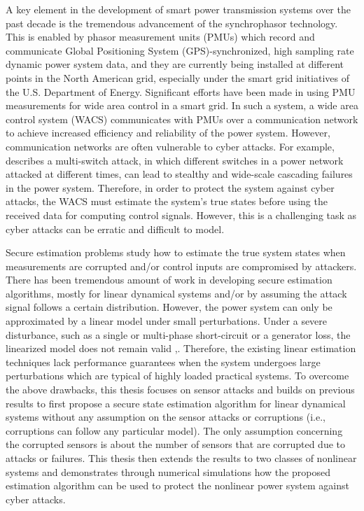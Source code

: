 \documentclass[../thesis.tex]{subfiles}
\begin{document}
A key element in the development of smart power transmission systems over the past decade is the tremendous advancement of the synchrophasor technology. 
This is enabled by phasor measurement units (PMUs) which record and communicate Global Positioning System (GPS)-synchronized, high sampling rate dynamic power system data, and they are currently being installed at different points in the North American grid, especially under the smart grid initiatives of the U.S. Department of Energy.
Significant efforts have been made in using PMU measurements for wide area control in a smart grid. 
In such a system, a wide area control system (WACS) communicates with PMUs over a communication network to achieve increased efficiency and reliability of the power system.
However, communication networks are often vulnerable to cyber attacks. 
For example, \cite{liu2014coordinated} describes a multi-switch attack, in which different switches in a power network attacked at different times, can lead to stealthy and wide-scale cascading failures in the power system.
Therefore, in order to protect the system against cyber attacks, the WACS must estimate the system's true states before using the received data for computing control signals.
However, this is a challenging task as cyber attacks can be erratic and difficult to model. 

Secure estimation problems study how to estimate the true system states when measurements are corrupted and/or control inputs are compromised by attackers.
There has been tremendous amount of work in developing secure estimation algorithms, mostly for linear dynamical systems and/or by assuming the attack signal follows a certain distribution.
However, the power system can only be approximated by a linear model under small perturbations. 
Under a severe disturbance, such as a single or multi-phase short-circuit or a generator loss, the linearized model does not remain valid \cite{Kundur},\cite{nonlin_est}. 
Therefore, the existing linear estimation techniques lack performance guarantees when the system undergoes large perturbations which are typical of highly loaded practical systems. 
To overcome the above drawbacks, this thesis focuses on sensor attacks and builds on previous results to first propose a secure state estimation algorithm for linear dynamical systems without any assumption on the sensor attacks or corruptions (i.e., corruptions can follow any particular model).
The only assumption concerning the corrupted sensors is about the number of sensors that are corrupted due to attacks or failures. 
This thesis then extends the results to two classes of nonlinear systems and demonstrates through numerical simulations how the proposed estimation algorithm can be used to protect the nonlinear power system against cyber attacks.
\end{document}
